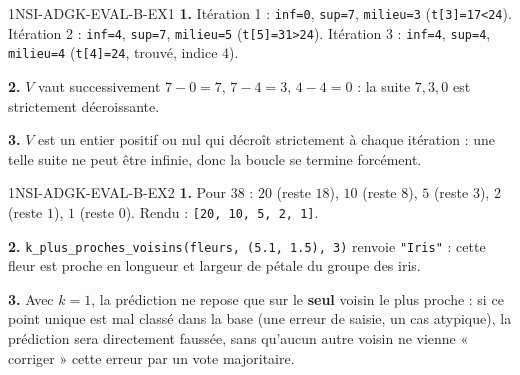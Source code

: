 \begin{corrige}{1NSI-ADGK-EVAL-B-EX1}
\textbf{1.} Itération 1 : \lstinline{inf=0}, \lstinline{sup=7}, \lstinline{milieu=3}
(\lstinline{t[3]=17<24}). Itération 2 : \lstinline{inf=4}, \lstinline{sup=7},
\lstinline{milieu=5} (\lstinline{t[5]=31>24}). Itération 3 : \lstinline{inf=4},
\lstinline{sup=4}, \lstinline{milieu=4} (\lstinline{t[4]=24}, trouvé, indice $4$).

\textbf{2.} $V$ vaut successivement $7-0=7$, $7-4=3$, $4-4=0$ : la suite $7,3,0$ est
strictement décroissante.

\textbf{3.} $V$ est un entier positif ou nul qui décroît strictement à chaque itération :
une telle suite ne peut être infinie, donc la boucle se termine forcément.
\end{corrige}

\begin{corrige}{1NSI-ADGK-EVAL-B-EX2}
\textbf{1.} Pour $38$ : $20$ (reste $18$), $10$ (reste $8$), $5$ (reste $3$), $2$ (reste
$1$), $1$ (reste $0$). Rendu : \lstinline{[20, 10, 5, 2, 1]}.

\textbf{2.} \lstinline{k_plus_proches_voisins(fleurs, (5.1, 1.5), 3)} renvoie
\lstinline{"Iris"} : cette fleur est proche en longueur et largeur de pétale du groupe des
iris.

\textbf{3.} Avec $k=1$, la prédiction ne repose que sur le \textbf{seul} voisin le plus
proche : si ce point unique est mal classé dans la base (une erreur de saisie, un cas
atypique), la prédiction sera directement faussée, sans qu'aucun autre voisin ne vienne
« corriger » cette erreur par un vote majoritaire.
\end{corrige}
